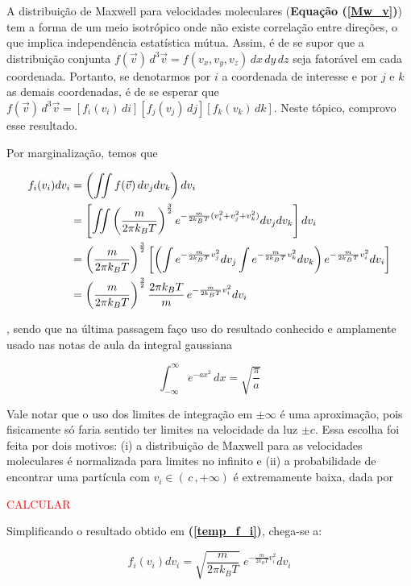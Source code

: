 \documentclass[12pt]{extarticle} %
\begin{document}
A distribuição de Maxwell para velocidades moleculares (\textbf{Equação (\ref{Mw_v})}) tem a forma de um meio isotrópico onde não existe correlação entre direções, o que implica independência estatística mútua. Assim, é de se supor que a distribuição conjunta $f(\vec{v}) \, d^3 \vec{v} = f(v_x,v_y,v_z) \, dx \, dy \, dz$ seja fatorável em cada coordenada. Portanto, se denotarmos por $i$ a coordenada de interesse e por $j$ e $k$ as demais coordenadas, é de se esperar que $f(\vec{v})\, d^3\vec{v} = \left[f_i(v_i)\, di\right] \left[f_j(v_j)\, dj \right]\left[f_k(v_k)\, dk\right]$. Neste tópico, comprovo esse resultado.

Por marginalização, temos que

\begin{align}
f_i(v_i) dv_i &= \left( \iint f(\vec{v}) \, dv_j dv_k \right) dv_i \notag \\
&= \left[ \iint \left(\frac{m}{2\pi k_BT}\right)^{\frac{3}{2}} 
    e^{-\frac{m}{2k_BT}(v_i^2+v_j^2+v_k^2)} dv_j dv_k \right] dv_i \notag \\
&= \left(\frac{m}{2\pi k_BT}\right)^{\frac{3}{2}} 
    \left[
        \left(
            \int e^{-\frac{m}{2k_BT}v_j^2} dv_j \int  e^{-\frac{m}{2k_BT}v_k^2} dv_k
        \right)
         e^{-\frac{m}{2k_BT}v_i^2} dv_i 
    \right] \notag \\
&= \left(\frac{m}{2\pi k_BT}\right)^{\frac{3}{2}} \frac{2\pi k_BT}{m} \, e^{-\frac{m}{2k_BT}v_i^2} dv_i \label{temp_f_i}
\end{align}

\noindent , sendo que na última passagem faço uso do resultado conhecido e amplamente usado nas notas de aula da integral gaussiana

$$\int_{-\infty}^{\infty}e^{-ax^2}\,dx = \sqrt{\frac{\pi}{a}}$$

Vale notar que o uso dos limites de integração em $\pm \infty$ é uma aproximação, pois fisicamente só faria sentido ter limites na velocidade da luz $\pm c$. Essa escolha foi feita por dois motivos: (i) a distribuição de Maxwell para as velocidades moleculares é normalizada para limites no infinito e (ii) a probabilidade de encontrar uma partícula com $v_i \in (\, c\, ,+\infty)$ é extremamente baixa, dada por 

\textcolor{red}{CALCULAR}

Simplificando o resultado obtido em \textbf{(\ref{temp_f_i})}, chega-se a:

\begin{equation}
\boxed{
    \, \, f_i(v_i) dv_i = \sqrt{\frac{m}{2\pi k_BT}} \, \, e^{-\frac{m}{2k_BT}v_i^2} dv_i \, \,
\label{f_i}
}
\end{equation}
\end{document}
